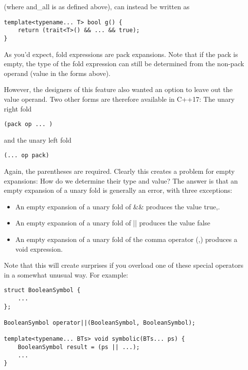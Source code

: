 (where and\_all is as defined above), can instead be written as

\begin{lstlisting}[style=styleCXX]
template<typename... T> bool g() {
	return (trait<T>() && ... && true);
}
\end{lstlisting}

As you’d expect, fold expressions are pack expansions. Note  that if the pack is empty, the type of the fold expression can still be determined from the non-pack operand (value in the forms above).

However, the designers of this feature also wanted an option to leave out the value operand. Two other forms are therefore available in C++17: The unary right fold

\begin{lstlisting}[style=styleCXX]
(pack op ... )
\end{lstlisting}

and the unary left fold

\begin{lstlisting}[style=styleCXX]
(... op pack)
\end{lstlisting}

Again, the parentheses are required. Clearly this creates a problem for empty expansions: How do we determine their type and value? The answer is that an empty expansion of a unary fold is generally an error, with three exceptions:

\begin{itemize}
\item
An empty expansion of a unary fold of \&\& produces the value true,.

\item
An empty expansion of a unary fold of || produces the value false

\item
An empty expansion of a unary fold of the comma operator (,) produces a void expression.
\end{itemize}

Note that this will create surprises if you overload one of these special operators in a somewhat unusual way. For example:

\begin{lstlisting}[style=styleCXX]
struct BooleanSymbol {
	...
};

BooleanSymbol operator||(BooleanSymbol, BooleanSymbol);

template<typename... BTs> void symbolic(BTs... ps) {
	BooleanSymbol result = (ps || ...);
	...
}
\end{lstlisting}

